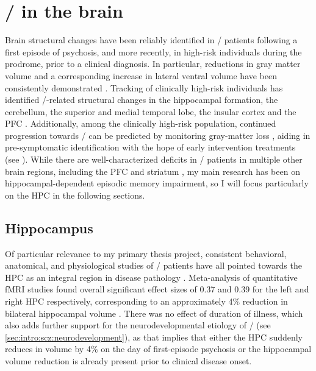 \section{\Scz/ in the brain}
\label{sec:intro:scz:brain}
Brain structural changes have been reliably identified in \scz/ patients following a first episode of psychosis, and more recently, in high-risk individuals during the prodrome, prior to a clinical diagnosis.
In particular, reductions in gray matter volume and a corresponding increase in lateral ventral volume have been consistently demonstrated \citep{Fusar-Poli2013, Shepherd2012}.
Tracking of clinically high-risk individuals has identified \scz/-related structural changes in the hippocampal formation, the cerebellum, the superior and medial temporal lobe, the insular cortex and the \ac{PFC} \citep{Cannon2015, Millan2016}.
Additionally, among the clinically high-risk population, continued progression towards \scz/ can be predicted by monitoring gray-matter loss \citep{Tognin2014}, aiding in pre-symptomatic identification with the hope of early intervention treatments (see ).
While there are well-characterized deficits in \scz/ patients in multiple other brain regions, including the \ac{PFC} \citep{Weinberger1986} and striatum \citep{Simpson2010}, my main research has been on hippocampal-dependent episodic memory impairment, so I will focus particularly on the \ac{HPC} in the following sections.

\subsection{Hippocampus}
\label{sec:intro:scz:hpc}
Of particular relevance to my primary thesis project, consistent behavioral, anatomical, and physiological studies of \scz/ patients have all pointed towards the HPC as an integral region in disease pathology \citep{Boyer2007, Bogerts1985, Jakob1986}.
Meta-analysis of quantitative \ac{fMRI} studies found overall significant effect sizes of 0.37 and 0.39 for the left and right \ac{HPC} respectively, corresponding to an approximately 4\% reduction in bilateral hippocampal volume \citep{Nelson1998}.
There was no effect of duration of illness, which also adds further support for the neurodevelopmental etiology of \scz/ (see \autoref{sec:intro:scz:neurodevelopment}), as that implies that either the \ac{HPC} suddenly reduces in volume by 4\% on the day of first-episode psychosis or the hippocampal volume reduction is already present prior to clinical disease onset. 

